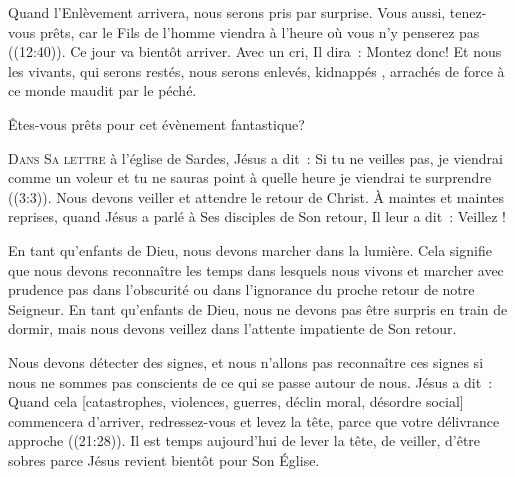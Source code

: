 
Quand l'Enlèvement arrivera, nous serons pris par surprise.
 \og Vous aussi, tenez-vous prêts, car le Fils de l'homme viendra à l'heure
 où vous n'y penserez pas \fg{}  ((12:40)).
 Ce jour va bientôt arriver. Avec un cri, Il dira~: 
 \og Montez donc! \fg{} Et nous les vivants, qui serons restés,
 nous serons enlevés, \og kidnappés \fg{}, arrachés de force
 à ce monde maudit par le péché.

Êtes-vous prêts pour cet évènement fantastique?

\dvrule






\lettrine{D}{ans Sa lettre} à l'église de Sardes,
 Jésus a dit~: 
 \og Si tu ne veilles pas, je viendrai comme un voleur et tu ne sauras point
 à quelle heure je viendrai te surprendre \fg{} ((3:3)).
 Nous devons veiller et attendre le retour de Christ.
 À maintes et maintes reprises, quand Jésus a parlé à Ses disciples
 de Son retour, Il leur a dit~:  \og Veillez ! \fg{}


En tant qu'enfants de Dieu, nous devons marcher dans la lumière.
 Cela signifie que nous devons reconnaître les temps dans lesquels nous vivons
 et marcher avec prudence \ocadr pas dans l'obscurité ou dans l'ignorance
 du proche retour de notre Seigneur. En tant qu'enfants de Dieu,
 nous ne devons pas être surpris en train de dormir,
 mais nous devons veillez dans l'attente impatiente de Son retour.

Nous devons détecter des signes, et nous n'allons pas reconnaître ces signes
 si nous ne sommes pas conscients de ce qui se passe autour de nous.
 Jésus a dit~: 
 \og Quand cela [catastrophes, violences, guerres, déclin moral,
 désordre social] commencera d'arriver, redressez-vous et levez la tête,
 parce que votre délivrance approche \fg{} ((21:28)).
 Il est temps aujourd'hui de lever la tête, de veiller, d'être sobres
 \ocadr parce Jésus revient bientôt pour Son Église. 

